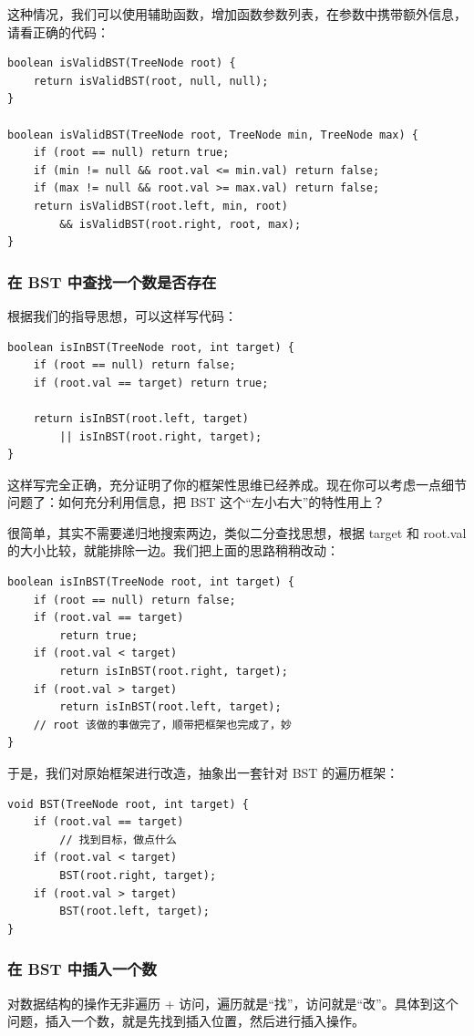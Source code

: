 \documentclass[12pt]{article}
\begin{document}
这种情况，我们可以使用辅助函数，增加函数参数列表，在参数中携带额外信息，请看正确的代码：
\begin{lstlisting}
boolean isValidBST(TreeNode root) {
    return isValidBST(root, null, null);
}

boolean isValidBST(TreeNode root, TreeNode min, TreeNode max) {
    if (root == null) return true;
    if (min != null && root.val <= min.val) return false;
    if (max != null && root.val >= max.val) return false;
    return isValidBST(root.left, min, root) 
        && isValidBST(root.right, root, max);
}
\end{lstlisting}

\subsubsection{在 BST 中查找一个数是否存在}
根据我们的指导思想，可以这样写代码：
\begin{lstlisting}
boolean isInBST(TreeNode root, int target) {
    if (root == null) return false;
    if (root.val == target) return true;

    return isInBST(root.left, target)
        || isInBST(root.right, target);
}
\end{lstlisting}

这样写完全正确，充分证明了你的框架性思维已经养成。现在你可以考虑一点细节问题了：如何充分利用信息，把 BST 这个“左小右大”的特性用上？

很简单，其实不需要递归地搜索两边，类似二分查找思想，根据 target 和 root.val 的大小比较，就能排除一边。我们把上面的思路稍稍改动：

\begin{lstlisting}
boolean isInBST(TreeNode root, int target) {
    if (root == null) return false;
    if (root.val == target)
        return true;
    if (root.val < target) 
        return isInBST(root.right, target);
    if (root.val > target)
        return isInBST(root.left, target);
    // root 该做的事做完了，顺带把框架也完成了，妙
}
\end{lstlisting}

于是，我们对原始框架进行改造，抽象出一套针对 BST 的遍历框架：
\begin{lstlisting}
void BST(TreeNode root, int target) {
    if (root.val == target)
        // 找到目标，做点什么
    if (root.val < target) 
        BST(root.right, target);
    if (root.val > target)
        BST(root.left, target);
}
\end{lstlisting}

\subsubsection{在 BST 中插入一个数}
对数据结构的操作无非遍历 + 访问，遍历就是“找”，访问就是“改”。具体到这个问题，插入一个数，就是先找到插入位置，然后进行插入操作。
\end{document}
